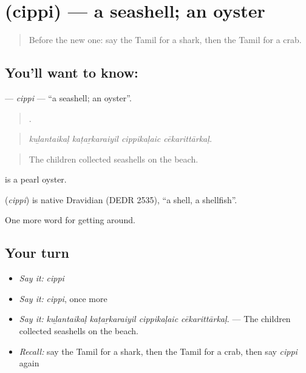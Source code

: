 \section[\texorpdfstring{\ta{சிப்பி} (cippi)}{சிப்பி (cippi)}]{ (cippi) — a seashell; an oyster}

\label{lesson:TA-C436-cippi}



\begin{quote}
Before the new one: say the Tamil for a shark, then the Tamil for a crab.
\end{quote}

\subsection*{You'll want to know: }
\textbf{} — \emph{cippi} — \textquotedblleft{}a seashell; an oyster\textquotedblright{}.

\begin{quote}
   .
\end{quote}

\begin{quote}
\emph{kuḻantaikaḷ kaṭaṟkaraiyil cippikaḷaic cēkarittārkaḷ.}
\end{quote}

\begin{quote}
The children collected seashells on the beach.
\end{quote}

  is a pearl oyster.

\begin{cousinweb}
\textbf{} (\emph{cippi}) is native Dravidian (DEDR 2535), \textquotedblleft{}a shell, a shellfish\textquotedblright{}.
\end{cousinweb}

\begin{grammarlens}[title={What you've built}]
One more word for getting around.
\end{grammarlens}

\subsection*{Your turn}
\begin{itemize}
\raggedright
  \item \emph{Say it:} \emph{cippi}
  \item \emph{Say it:} \emph{cippi}, once more
  \item \emph{Say it:} \emph{kuḻantaikaḷ kaṭaṟkaraiyil cippikaḷaic cēkarittārkaḷ.} — The children collected seashells on the beach.
  \item \emph{Recall:} say the Tamil for a shark, then the Tamil for a crab, then say \emph{cippi} again
\end{itemize}

